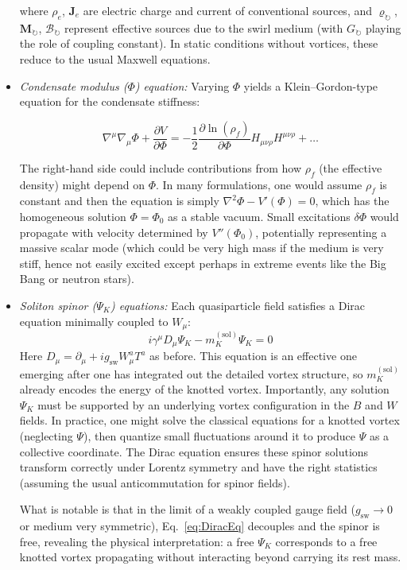\documentclass[10pt,reprint,aps,onecolumn,nofootinbib]{revtex4-2}
\newcommand{\rhoF}{\rho_{\!f}}     %
\begin{document}
\begin{itemize}
where $\rho_e$, $\mathbf{J}_e$ are electric charge and current of conventional sources, and $\varrho_{\circlearrowright}$, $\mathbf{M}_{\circlearrowright}$, $\bm{\mathcal{B}}_{\circlearrowright}$ represent effective sources due to the swirl medium (with $G_{\circlearrowright}$ playing the role of coupling constant). In static conditions without vortices, these reduce to the usual Maxwell equations.

\item 
\emph{Condensate modulus ($\Phi$) equation:} Varying $\Phi$ yields a Klein--Gordon-type equation for the condensate stiffness:

\begin{equation}
\nabla^\mu \nabla_\mu \Phi + \frac{\partial V}{\partial \Phi} = -\frac{1}{2} \frac{\partial \ln(\rhoF)}{\partial \Phi} H_{\mu\nu\rho} H^{\mu\nu\rho} + \ldots
\label{eq:PhiEq}
\end{equation}

The right-hand side could include contributions from how $\rhoF$ (the effective density) might depend on $\Phi$. In many formulations, one would assume $\rhoF$ is constant and then the equation is simply $\nabla^2 \Phi - V'(\Phi)=0$, which has the homogeneous solution $\Phi=\Phi_0$ as a stable vacuum. Small excitations $\delta \Phi$ would propagate with velocity determined by $V''(\Phi_0)$, potentially representing a massive scalar mode (which could be very high mass if the medium is very stiff, hence not easily excited except perhaps in extreme events like the Big Bang or neutron stars).




\item 
\emph{Soliton spinor ($\Psi_K$) equations:} Each quasiparticle field satisfies a Dirac equation minimally coupled to $W_\mu$:
\begin{equation}
i\gamma^\mu D_\mu \Psi_K - m^{(\text{sol})}_K \Psi_K = 0
\label{eq:DiracEq}
\end{equation}
Here $D_\mu = \partial_\mu + i g_{\text{sw}} W_\mu^a T^a$ as before. This equation is an effective one emerging after one has integrated out the detailed vortex structure, so $m^{(\text{sol})}_K$ already encodes the energy of the knotted vortex. Importantly, any solution $\Psi_K$ must be supported by an underlying vortex configuration in the $B$ and $W$ fields. In practice, one might solve the classical equations for a knotted vortex (neglecting $\Psi$), then quantize small fluctuations around it to produce $\Psi$ as a collective coordinate. The Dirac equation ensures these spinor solutions transform correctly under Lorentz symmetry and have the right statistics (assuming the usual anticommutation for spinor fields).

What is notable is that in the limit of a weakly coupled gauge field ($g_{\text{sw}}\to 0$ or medium very symmetric), Eq.~\ref{eq:DiracEq} decouples and the spinor is free, revealing the physical interpretation: a free $\Psi_K$ corresponds to a free knotted vortex propagating without interacting beyond carrying its rest mass.

\end{itemize}
\end{document}
